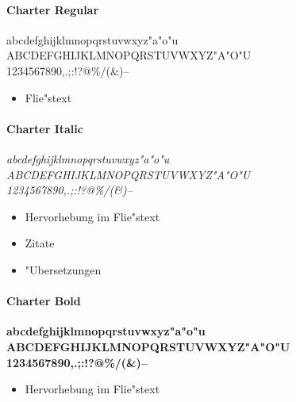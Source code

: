 \documentclass[twoside,colorback,accentcolor=tud4c,11pt]{tudreport}
\begin{document}
    \paragraph{Charter Regular}
      \hfill%
      \begin{minipage}{\textwidth-\the\parindent}
        \normalfont\normalsize
        \noindent
        abcdefghijklmnopqrstuvwxyz"a"o"u\\
        ABCDEFGHIJKLMNOPQRSTUVWXYZ"A"O"U\\
        1234567890,.;:!?\glqq\grqq{}@\texteuro\%/(\&)--
      \end{minipage}
      \begin{itemize}
        \item Flie"stext
      \end{itemize}

    \paragraph{Charter Italic}
      \hfill%
      \begin{minipage}{\textwidth-\the\parindent}
        \it
        \noindent
        abcdefghijklmnopqrstuvwxyz"a"o"u\\
        ABCDEFGHIJKLMNOPQRSTUVWXYZ"A"O"U\\
        1234567890,.;:!?\glqq\grqq{}@\texteuro\%/(\&)--
      \end{minipage}
      \begin{itemize}
        \item Hervorhebung im Flie"stext
        \item Zitate
        \item "Ubersetzungen
      \end{itemize}

    \paragraph{Charter Bold}
      \hfill%
      \begin{minipage}{\textwidth-\the\parindent}
        \bf
        \noindent
        abcdefghijklmnopqrstuvwxyz"a"o"u\\
        ABCDEFGHIJKLMNOPQRSTUVWXYZ"A"O"U\\
        1234567890,.;:!?\glqq\grqq{}@\texteuro\%/(\&)--
      \end{minipage}
      \begin{itemize}
        \item Hervorhebung im Flie"stext
      \end{itemize}
    
\end{document}
